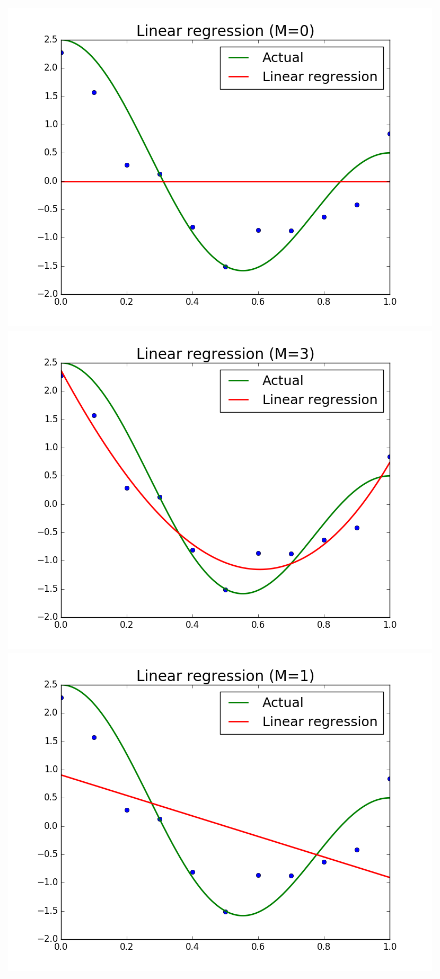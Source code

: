 \documentclass{article}
\begin{document}
\begin{figure}[width=\linewidth]
\centering
\begin{multicols}{2}
  \includegraphics[width=1.2\linewidth]{code/P2/linear_regression,0.png}
  \includegraphics[width=1.2\linewidth]{code/P2/linear_regression,3.png}
  \includegraphics[width=1.2\linewidth]{code/P2/linear_regression,1.png}

\end{multicols}
\end{figure}
\end{document}
